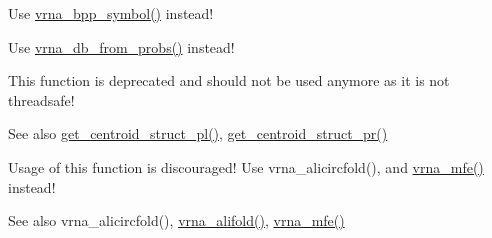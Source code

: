 \begin{DoxyRefList}
\item[\label{deprecated__deprecated000143}%
\hypertarget{deprecated__deprecated000143}{}%
global\+Scope$>$ Global \hyperlink{group__struct__utils_ga49962ad6242b8c628de6ca16bb831c1d}{bppm\+\_\+symbol} (const float $\ast$x)]Use \hyperlink{group__struct__utils_ga025bff1b27fa46534c8fae6980f64bb5}{vrna\+\_\+bpp\+\_\+symbol()} instead!  
\item[\label{deprecated__deprecated000142}%
\hypertarget{deprecated__deprecated000142}{}%
global\+Scope$>$ Global \hyperlink{group__struct__utils_ga129d81c4a1ead793c5b2311333e03dfa}{bppm\+\_\+to\+\_\+structure} (char $\ast$structure, F\+L\+T\+\_\+\+O\+R\+\_\+\+D\+B\+L $\ast$pr, unsigned int length)]Use \hyperlink{group__struct__utils_ga0c28c410a5ab22d6ab9c77a84e8d5b44}{vrna\+\_\+db\+\_\+from\+\_\+probs()} instead!  
\item[\label{deprecated__deprecated000104}%
\hypertarget{deprecated__deprecated000104}{}%
global\+Scope$>$ Global \hyperlink{part__func_8h_ae89a63bd83e75a80b2ba36d20b31ce81}{centroid} (int length, double $\ast$dist)]This function is deprecated and should not be used anymore as it is not threadsafe! \begin{DoxySeeAlso}{See also}
\hyperlink{centroid_8h_a8f387bf1583fb5eaf5f4ffd78493e43e}{get\+\_\+centroid\+\_\+struct\+\_\+pl()}, \hyperlink{centroid_8h_ac92486ce514677256f4a832dc518759c}{get\+\_\+centroid\+\_\+struct\+\_\+pr()}  
\end{DoxySeeAlso}

\item[\label{deprecated__deprecated000013}%
\hypertarget{deprecated__deprecated000013}{}%
global\+Scope$>$ Global \hyperlink{group__consensus__mfe__fold_gadbd3b0b1c144cbfb4efe704b2b260f96}{circalifold} (const char $\ast$$\ast$strings, char $\ast$structure)]Usage of this function is discouraged! Use vrna\+\_\+alicircfold(), and \hyperlink{group__mfe__fold_gabd3b147371ccf25c577f88bbbaf159fd}{vrna\+\_\+mfe()} instead! \begin{DoxySeeAlso}{See also}
vrna\+\_\+alicircfold(), \hyperlink{group__consensus__mfe__fold_ga02098d0c8790f9a37fbef6ad0cfc705c}{vrna\+\_\+alifold()}, \hyperlink{group__mfe__fold_gabd3b147371ccf25c577f88bbbaf159fd}{vrna\+\_\+mfe()} 
\end{DoxySeeAlso}


\end{DoxyRefList}
